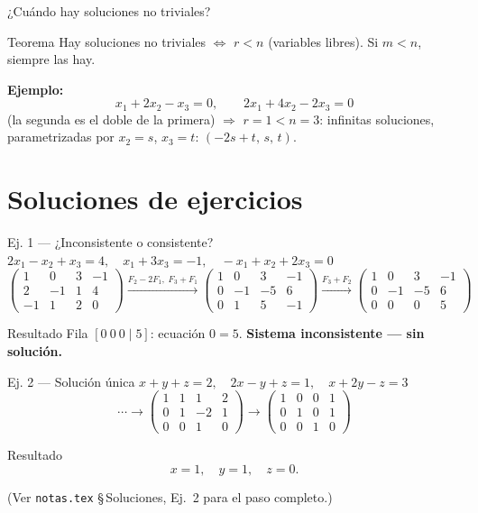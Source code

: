 \documentclass[11pt]{beamer}
\begin{document}
\begin{frame}{¿Cuándo hay soluciones no triviales?}
  \begin{alertblock}{Teorema}
    Hay soluciones no triviales $\iff$ $r<n$ (variables libres). Si $m<n$, siempre las hay.
  \end{alertblock}
  \vfill
  \textbf{Ejemplo:}
  \[
    x_1+2x_2-x_3=0, \qquad 2x_1+4x_2-2x_3=0
  \]
  (la segunda es el doble de la primera) $\Rightarrow$ $r=1<n=3$: infinitas soluciones,
  parametrizadas por $x_2=s$, $x_3=t$: $(-2s+t,\,s,\,t)$.
\end{frame}

\section{Soluciones de ejercicios}

\begin{frame}{Ej. 1 — ¿Inconsistente o consistente?}
  $2x_1-x_2+x_3=4,\quad x_1+3x_3=-1,\quad -x_1+x_2+2x_3=0$
  \[
    \left(\begin{array}{ccc|c}1&0&3&-1\\2&-1&1&4\\-1&1&2&0\end{array}\right)
    \xrightarrow{F_2-2F_1,\;F_3+F_1}
    \left(\begin{array}{ccc|c}1&0&3&-1\\0&-1&-5&6\\0&1&5&-1\end{array}\right)
    \xrightarrow{F_3+F_2}
    \left(\begin{array}{ccc|c}1&0&3&-1\\0&-1&-5&6\\0&0&0&5\end{array}\right)
  \]
  \begin{alertblock}{Resultado}
    Fila $[0\ 0\ 0\mid 5]$: ecuación $0=5$. \textbf{Sistema inconsistente — sin solución.}
  \end{alertblock}
\end{frame}

\begin{frame}{Ej. 2 — Solución única}
  $x+y+z=2,\quad 2x-y+z=1,\quad x+2y-z=3$
  \[
    \cdots\longrightarrow
    \left(\begin{array}{ccc|c}1&1&1&2\\0&1&-2&1\\0&0&1&0\end{array}\right)
    \longrightarrow
    \left(\begin{array}{ccc|c}1&0&0&1\\0&1&0&1\\0&0&1&0\end{array}\right)
  \]
  \begin{block}{Resultado}
    \[ \boxed{x=1,\quad y=1,\quad z=0.} \]
  \end{block}
  \small(Ver \texttt{notas.tex} §\,Soluciones, Ej.\ 2 para el paso completo.)
\end{frame}
\end{document}
